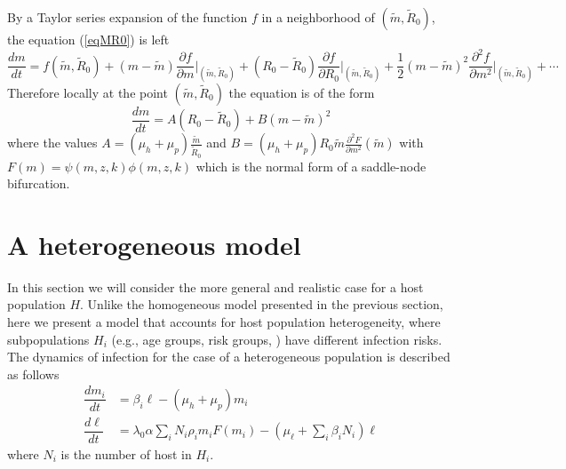 \documentclass[eng]{MMSB-class-eng}
\begin{document}
By a Taylor series expansion of the function $f$ in a neighborhood of $(\tilde m,\tilde R_0)$, the equation (\ref{eqMR0}) is left
\begin{equation}
{\scriptstyle	
	\frac{dm}{dt}=f(\tilde m,\tilde R_0)+(m-\tilde m)\frac{\partial f }{\partial m}\big\vert_{(\tilde m,\tilde R_0)}%
	+(R_0-\tilde R_0){\frac{\partial f }{\partial R_0}\big\vert_{(\tilde m,\tilde R_0)}}%
	+{\frac {1}{2}}(m-\tilde m)^2{\frac{\partial^2 f }{\partial m^2}}\big\vert_{(\tilde m,\tilde R_0)}%
	+\cdots 
}
\end{equation}
Therefore locally at the point $(\tilde m,\tilde R_0)$ the equation is of the form
\begin{equation}
\dfrac{dm}{dt}=A(R_0-\tilde R_0)+B(m-\tilde m)^2
\end{equation}
where the values $A=(\mu_h +\mu_p)\frac{\tilde m}{\tilde R_0}$ and $B=(\mu_h + \mu_p) R_0 \tilde m \frac{\partial^2 F}{\partial m^2}(\tilde m)$ with $F(m)= \psi(m,z,k)\phi(m,z, k)$
which is the normal form of a saddle-node bifurcation.

\section{A heterogeneous model}
In this section we will consider the more general and realistic case for a host population $H$. Unlike the homogeneous model presented in the previous section, here we present a model that accounts for host population heterogeneity, where subpopulations $H_i$ (e.g., age groups, risk groups, \citet{anderson1992infectious,anderson2014coverage,truscott2014modeling}) have different infection risks. The dynamics of infection for the case of a heterogeneous population is described as follows
\begin{equation}\label{model2}
\begin{split}
\dfrac{dm_i}{dt}&=\beta_i \ell - (\mu_h+\mu_p) m_i\\
\dfrac{d\ell}{dt}&= 
\lambda_0 \alpha
\sum_i  N_i \rho_i  m_i F(m_i)   - (\mu_{\ell}+\sum_i \beta_i N_i ) \ell 
\end{split}
\end{equation} 
where $N_{i}$ is the number of host in $H_i$.
\end{document}
